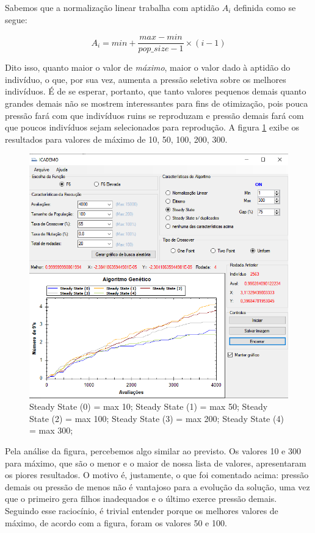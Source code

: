 \documentclass[12pt]{article}
\begin{document}
Sabemos que a normalização linear trabalha com aptidão $A_i$ definida como se segue:

\begin{equation*}
	A_i=min+\dfrac{max-min}{pop\_size-1}\times (i-1)
\end{equation*}

Dito isso, quanto maior o valor de \textit{máximo}, maior o valor dado à aptidão do indivíduo, o que, por sua vez, aumenta a pressão seletiva sobre os melhores indivíduos. É de se esperar, portanto, que tanto valores pequenos demais quanto grandes demais não se mostrem interessantes para fins de otimização, pois pouca pressão fará com que indivíduos ruins se reproduzam e pressão demais fará com que poucos indivíduos sejam selecionados para reprodução. A figura \ref{fig:questao7} exibe os resultados para valores de máximo de 10, 50, 100, 200, 300.

\begin{figure}[H]
	\centering
	\includegraphics[width=0.7\linewidth]{Imagens/questao7}
	\caption{Steady State (0) = max 10; Steady State (1) = max 50; Steady State (2) = max 100; Steady State (3) = max 200; Steady State (4) = max 300;}
	\label{fig:questao7}
\end{figure}

Pela análise da figura, percebemos algo similar ao previsto. Os valores 10 e 300 para máximo, que são o menor e o maior de nossa lista de valores, apresentaram os piores resultados. O motivo é, justamente, o que foi comentado acima: pressão demais ou pressão de menos não é vantajoso para a evolução da solução, uma vez que o primeiro gera filhos inadequados e o último exerce pressão demais.  Seguindo esse raciocínio, é trivial entender porque os melhores valores de máximo, de acordo com a figura, foram os valores 50 e 100.
\end{document}
